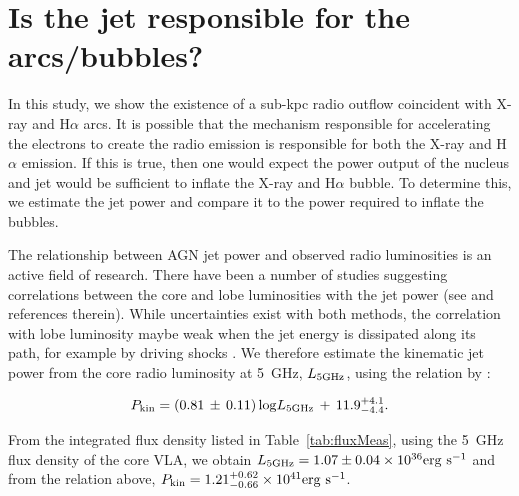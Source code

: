 \documentclass[fleqn,usenatbib]{mnras}
\def\tab{Table}
\begin{document}
\section{Is the jet responsible for the arcs/bubbles?}
\label{sec:jet_pwr}

{In this study, we show the existence of a sub-kpc radio outflow coincident with X-ray and H$\alpha$ arcs. It is possible that the mechanism responsible for accelerating the electrons to create the radio emission is responsible for both the X-ray and H$\alpha$ emission. If this is true, then one would expect the power output of the nucleus and jet would be sufficient to inflate the X-ray and H$\alpha$ bubble. }To determine this, we estimate the jet power and compare it to the power required to inflate the bubbles.

{The relationship between AGN jet power and observed radio luminosities is an active field of 
research. There have been a number of studies suggesting correlations between the core and lobe 
luminosities with the jet power (see \citealt{MH07,BF2011,GS2016} and references therein). While uncertainties exist with both methods,  the correlation with lobe luminosity maybe weak when the jet energy is dissipated along its path, for example by driving shocks \citep{GS2016}. We therefore estimate the kinematic jet power from the core radio luminosity at 5~GHz, $L_{5 \rm GHz}$, using the 
relation by \cite{MH07}:} 

\begin{equation}
P_{\rm kin} = (0.81\,\pm\,0.11)\,{\rm log}L_{5 \rm GHz}\, +\, 11.9^{+4.1}_{-4.4}.
\end{equation}

From the integrated flux density listed in \tab~\ref{tab:fluxMeas}, using the 5~GHz flux density of the core VLA, we obtain  
$L_{5 \rm GHz} = 1.07 \pm 0.04 \times 10^{36} {\rm erg~s^{-1}}$ and from the relation above, $P_{\rm 
kin} = 1.21^{+0.62}_{-0.66} \times 10^{41} {\rm erg~s^{-1}}$. 
\end{document}
